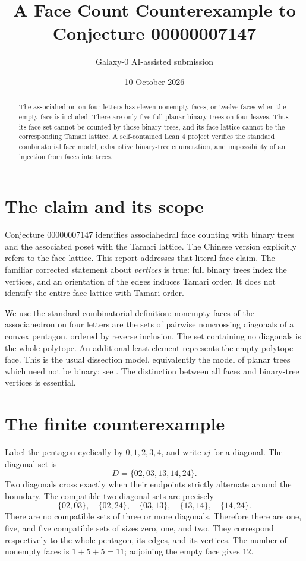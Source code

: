 \documentclass[10pt]{article}
\title{A Face Count Counterexample to Conjecture 00000007147}
\author{Galaxy-0 \quad AI-assisted submission}
\date{10 October 2026}
\begin{document}
\maketitle
\begin{abstract}
The associahedron on four letters has eleven nonempty faces, or twelve faces when the empty face is included. There are only five full planar binary trees on four leaves. Thus its face set cannot be counted by those binary trees, and its face lattice cannot be the corresponding Tamari lattice. A self-contained Lean 4 project verifies the standard combinatorial face model, exhaustive binary-tree enumeration, and impossibility of an injection from faces into trees.
\end{abstract}

\section{The claim and its scope}
Conjecture 00000007147 identifies associahedral face counting with binary trees and the associated poset with the Tamari lattice. The Chinese version explicitly refers to the face lattice. This report addresses that literal face claim. The familiar corrected statement about \emph{vertices} is true: full binary trees index the vertices, and an orientation of the edges induces Tamari order. It does not identify the entire face lattice with Tamari order.

We use the standard combinatorial definition: nonempty faces of the associahedron on four letters are the sets of pairwise noncrossing diagonals of a convex pentagon, ordered by reverse inclusion. The set containing no diagonals is the whole polytope. An additional least element represents the empty polytope face. This is the usual dissection model, equivalently the model of planar trees which need not be binary; see \cite{MTTV,McC}. The distinction between all faces and binary-tree vertices is essential.

\section{The finite counterexample}
Label the pentagon cyclically by $0,1,2,3,4$, and write $ij$ for a diagonal. The diagonal set is
\[
D=\{02,03,13,14,24\}.
\]
Two diagonals cross exactly when their endpoints strictly alternate around the boundary. The compatible two-diagonal sets are precisely
\[
\{02,03\},\quad\{02,24\},\quad\{03,13\},\quad
\{13,14\},\quad\{14,24\}.
\]
There are no compatible sets of three or more diagonals. Therefore there are one, five, and five compatible sets of sizes zero, one, and two. They correspond respectively to the whole pentagon, its edges, and its vertices. The number of nonempty faces is $1+5+5=11$; adjoining the empty face gives $12$.
\end{document}
